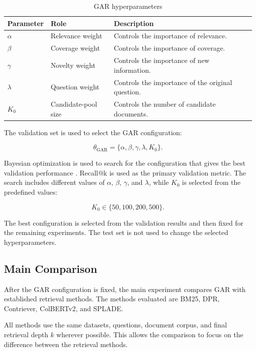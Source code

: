 \documentclass[12pt,a4paper]{report}
\begin{document}
\begin{table}[H]
\centering
\caption{GAR hyperparameters}
\label{tab:gar-hyperparameters}
\renewcommand{\arraystretch}{1.25}
\begin{tabular}{|p{1.05in}|p{1.55in}|p{3.65in}|}
\hline
\textbf{Parameter} & \textbf{Role} & \textbf{Description} \\ \hline
$\alpha$ & Relevance weight & Controls the importance of relevance. \\ \hline
$\beta$ & Coverage weight & Controls the importance of coverage. \\ \hline
$\gamma$ & Novelty weight & Controls the importance of new information. \\ \hline
$\lambda$ & Question weight & Controls the importance of the original question. \\ \hline
$K_0$ & Candidate-pool size & Controls the number of candidate documents. \\ \hline
\end{tabular}
\end{table}

The validation set is used to select the GAR configuration:

\[
\theta_{\mathrm{GAR}}
=
\{\alpha,\beta,\gamma,\lambda,K_0\}.
\]

Bayesian optimization is used to search for the configuration that gives the best validation performance \cite{snoek2012practical}. Recall@k is used as the primary validation metric. The search includes different values of $\alpha$, $\beta$, $\gamma$, and $\lambda$, while $K_0$ is selected from the predefined values:

\[
K_0\in\{50,100,200,500\}.
\]

The best configuration is selected from the validation results and then fixed for the remaining experiments. The test set is not used to change the selected hyperparameters.

\subsection{Main Comparison}

After the GAR configuration is fixed, the main experiment compares GAR with established retrieval methods. The methods evaluated are BM25, DPR, Contriever, ColBERTv2, and SPLADE.

All methods use the same datasets, questions, document corpus, and final retrieval depth $k$ wherever possible. This allows the comparison to focus on the difference between the retrieval methods.
\end{document}
